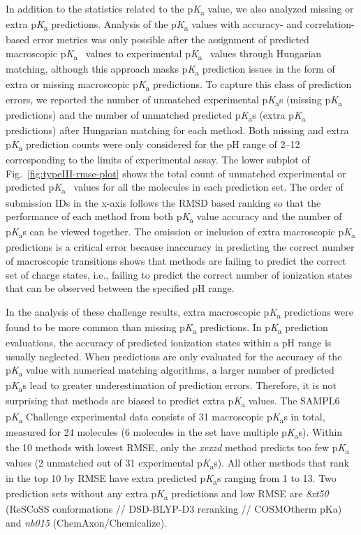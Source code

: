 \documentclass[9pt,lineno,final]{elife}
\newcommand{\pKa}{p\textit{K}\textsubscript{a}}
\begin{document}
In addition to the statistics related to the \pKa{} value, we also analyzed missing or extra \pKa{} predictions. 
Analysis of the \pKa{} values with accuracy- and correlation-based error metrics was only possible after the assignment of predicted macroscopic \pKa{}~ values to experimental \pKa{}~ values through Hungarian matching, although this approach masks \pKa{} prediction issues in the form of extra or missing macroscopic \pKa{} predictions. 
To capture this class of prediction errors, we reported the number of unmatched experimental \pKa{}s (missing \pKa{} predictions) and the number of unmatched predicted \pKa{}s (extra \pKa{} predictions) after Hungarian matching for each method. 
Both missing and extra \pKa{} prediction counts were only considered for the pH range of 2--12 corresponding to the limits of experimental assay.
The lower subplot of Fig.~\ref{fig:typeIII-rmse-plot} shows the total count of unmatched experimental or predicted \pKa{}~ values for all the molecules in each prediction set. 
The order of submission IDs in the x-axis follows the RMSD based ranking so that the performance of each method from both \pKa{} value accuracy and the number of \pKa{}s can be viewed together.
The omission or inclusion of extra macroscopic \pKa{} predictions is a critical error because inaccuracy in predicting the correct number of macroscopic transitions shows that methods are failing to predict the correct set of charge states, i.e., failing to predict the correct number of ionization states that can be observed between the specified pH range. 

In the analysis of these challenge results, extra macroscopic \pKa{} predictions were found to be more common than missing \pKa{} predictions. 
In \pKa{} prediction evaluations, the accuracy of predicted ionization states within a pH range is usually neglected. 
When predictions are only evaluated for the accuracy of the \pKa{} value with numerical matching algorithms, a larger number of predicted \pKa{}s lead to greater underestimation of prediction errors. 
Therefore, it is not surprising that methods are biased to predict extra \pKa{} values. 
The SAMPL6 \pKa{} Challenge experimental data consists of 31 macroscopic \pKa{}s in total, measured for 24 molecules (6 molecules in the set have multiple \pKa{}s).
Within the 10 methods with lowest RMSE, only the \textit{xvxzd} method predicts too few \pKa{} values (2 unmatched out of 31 experimental \pKa{}s). 
All other methods that rank in the top 10 by RMSE have extra predicted \pKa{}s ranging from 1 to 13. 
Two prediction sets without any extra \pKa{} predictions and low RMSE are \textit{8xt50} (ReSCoSS conformations // DSD-BLYP-D3 reranking // COSMOtherm pKa) and \textit{nb015} (ChemAxon/Chemicalize).
\end{document}
